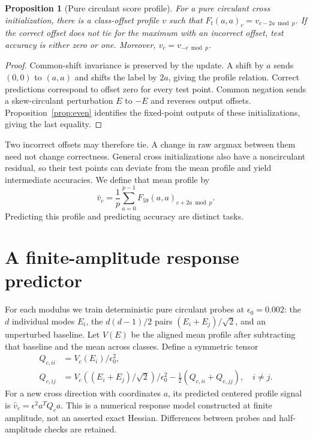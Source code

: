 \documentclass[11pt]{article}
\newtheorem{proposition}{Proposition}
\begin{document}
\begin{proposition}[Pure circulant score profile]\label{prop:profile}
For a pure circulant cross initialization, there is a class-offset profile $v$ such that $F_t(a,a)_c=v_{c-2a\bmod p}$. If the correct offset does not tie for the maximum with an incorrect offset, test accuracy is either zero or one. Moreover, $v_c=v_{-c\bmod p}$.
\end{proposition}
\begin{proof}
Common-shift invariance is preserved by the update. A shift by $a$ sends $(0,0)$ to $(a,a)$ and shifts the label by $2a$, giving the profile relation. Correct predictions correspond to offset zero for every test point. Common negation sends a skew-circulant perturbation $E$ to $-E$ and reverses output offsets. Proposition~\ref{prop:even} identifies the fixed-point outputs of these initializations, giving the last equality.
\end{proof}
Two incorrect offsets may therefore tie. A change in raw argmax between them need not change correctness. General cross initializations also have a noncirculant residual, so their test points can deviate from the mean profile and yield intermediate accuracies. We define that mean profile by
\begin{equation}
 \bar v_c=\frac1p\sum_{a=0}^{p-1} F_{59}(a,a)_{c+2a\bmod p}.
\end{equation}
Predicting this profile and predicting accuracy are distinct tasks.

\section{A finite-amplitude response predictor}\label{sec:predictor}
For each modulus we train deterministic pure circulant probes at $\epsilon_0=0.002$: the $d$ individual modes $E_i$, the $d(d-1)/2$ pairs $(E_i+E_j)/\sqrt2$, and an unperturbed baseline. Let $V(E)$ be the aligned mean profile after subtracting that baseline and the mean across classes. Define a symmetric tensor
\begin{align}
 Q_{c,ii}&=V_c(E_i)/\epsilon_0^2,\\
 Q_{c,ij}&=V_c((E_i+E_j)/\sqrt2)/\epsilon_0^2-\tfrac12(Q_{c,ii}+Q_{c,jj}),\quad i\ne j.\label{eq:tensor}
\end{align}
For a new cross direction with coordinates $a$, its predicted centered profile signal is $\widehat v_c=\epsilon^2a^TQ_ca$. This is a numerical response model constructed at finite amplitude, not an asserted exact Hessian. Differences between probes and half-amplitude checks are retained.
\end{document}
